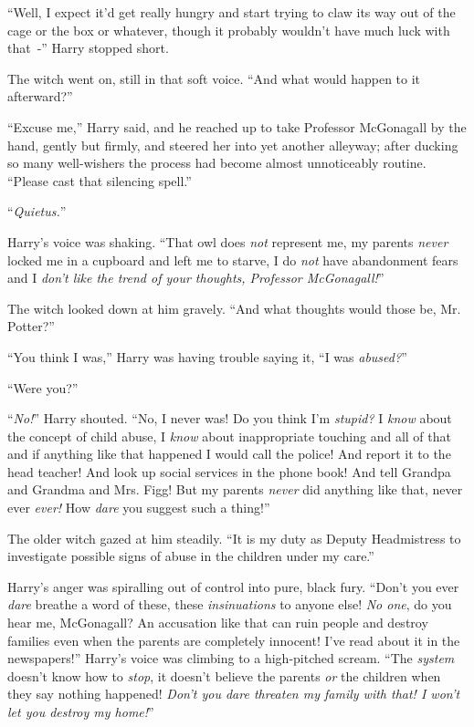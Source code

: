 ``Well, I expect it'd get really hungry and start trying to claw its way out of the cage or the box or whatever, though it probably wouldn't have much luck with that~-'' Harry stopped short.

The witch went on, still in that soft voice. ``And what would happen to it afterward?''

``Excuse me,'' Harry said, and he reached up to take Professor McGonagall by the hand, gently but firmly, and steered her into yet another alleyway; after ducking so many well-wishers the process had become almost unnoticeably routine. ``Please cast that silencing spell.''

``\emph{Quietus.}''

Harry's voice was shaking. ``That owl does \emph{not} represent me, my parents \emph{never} locked me in a cupboard and left me to starve, I do \emph{not} have abandonment fears and I \emph{don't like the trend of your thoughts, Professor McGonagall!}''

The witch looked down at him gravely. ``And what thoughts would those be, Mr. Potter?''

``You think I was,'' Harry was having trouble saying it, ``I was \emph{abused?}''

``Were you?''

``\emph{No!}'' Harry shouted. ``No, I never was! Do you think I'm \emph{stupid?} I \emph{know} about the concept of child abuse, I \emph{know} about inappropriate touching and all of that and if anything like that happened I would call the police! And report it to the head teacher! And look up social services in the phone book! And tell Grandpa and Grandma and Mrs. Figg! But my parents \emph{never} did anything like that, never ever \emph{ever!} How \emph{dare} you suggest such a thing!''

The older witch gazed at him steadily. ``It is my duty as Deputy Headmistress to investigate possible signs of abuse in the children under my care.''

Harry's anger was spiralling out of control into pure, black fury. ``Don't you ever \emph{dare} breathe a word of these, these \emph{insinuations} to anyone else! \emph{No one}, do you hear me, McGonagall? An accusation like that can ruin people and destroy families even when the parents are completely innocent! I've read about it in the newspapers!'' Harry's voice was climbing to a high-pitched scream. ``The \emph{system} doesn't know how to \emph{stop}, it doesn't believe the parents \emph{or} the children when they say nothing happened! \emph{Don't you dare threaten my family with that! I won't let you destroy my home!}''


